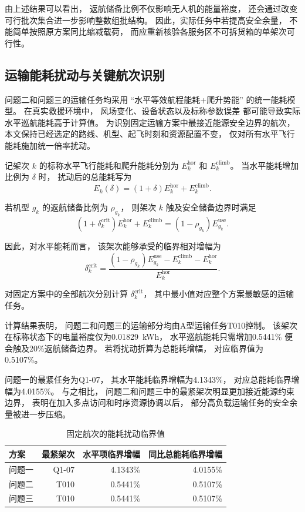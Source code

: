 由上述结果可以看出，
返航储备比例不仅影响无人机的能量裕度，
还会通过改变可行批次集合进一步影响整数组批结构。
因此，实际任务中若提高安全余量，
不能简单按照原方案同比缩减载荷，
而应重新核验各服务区不可拆货箱的单架次可行性。

\subsection{运输能耗扰动与关键航次识别}

问题二和问题三的运输任务均采用
``水平等效航程能耗+爬升势能''
的统一能耗模型。
在真实救援环境中，
风场变化、设备状态以及标称参数误差
都可能导致实际水平巡航能耗高于计算值。
为识别固定运输方案中最接近能源安全边界的航次，
本文保持已经选定的路线、机型、起飞时刻和资源配置不变，
仅对所有水平飞行能耗施加统一倍率扰动。

记架次 $k$ 的标称水平飞行能耗和爬升能耗分别为
$E_k^{\mathrm{hor}}$ 和 $E_k^{\mathrm{climb}}$。
当水平能耗增加比例为 $\delta$ 时，
扰动后的总能耗写为
\begin{equation}
E_k(\delta)
=
(1+\delta)E_k^{\mathrm{hor}}
+
E_k^{\mathrm{climb}}.
\end{equation}

若机型 $g_k$ 的返航储备比例为 $\rho_{g_k}$，
则架次 $k$ 触及安全储备边界时满足
\begin{equation}
(1+\delta_k^{\mathrm{crit}})
E_k^{\mathrm{hor}}
+
E_k^{\mathrm{climb}}
=
(1-\rho_{g_k})E_{g_k}^{\mathrm{use}}.
\end{equation}

因此，对水平能耗而言，
该架次能够承受的临界相对增幅为
\begin{equation}
\delta_k^{\mathrm{crit}}
=
\frac{
(1-\rho_{g_k})E_{g_k}^{\mathrm{use}}
-
E_k^{\mathrm{climb}}
-
E_k^{\mathrm{hor}}
}{
E_k^{\mathrm{hor}}
}.
\end{equation}

对固定方案中的全部航次分别计算
$\delta_k^{\mathrm{crit}}$，
其中最小值对应整个方案最敏感的运输任务。

计算结果表明，
问题二和问题三的运输部分均由A型运输任务T010控制。
该架次在标称状态下的电量裕度仅为0.01829~kWh，
水平巡航能耗只需增加0.5441\%
便会触及20\%返航储备边界。
若将扰动折算为总能耗增幅，
对应临界值为0.5107\%。

问题一的最紧任务为Q1-07，
其水平能耗临界增幅为4.1343\%，
对应总能耗临界增幅为4.0155\%。
与之相比，
问题二和问题三中的最紧架次明显更加接近能源约束边界，
表明在加入多点访问和时序资源协调以后，
部分高负载运输任务的安全余量被进一步压缩。

\begin{table}[H]\centering\caption{固定航次的能耗扰动临界值}\label{tab:energy_stress}
\begin{tabular}{lrrr}\toprule
方案 & 最紧架次 & 水平项临界增幅 & 同比总能耗临界增幅\\\midrule
问题一 & Q1-07 & 4.1343\% & 4.0155\%\\
问题二 & T010 & 0.5441\% & 0.5107\%\\
问题三 & T010 & 0.5441\% & 0.5107\%\\\bottomrule
\end{tabular}\end{table}

